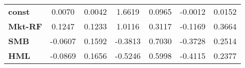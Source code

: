 \begin{center}
\begin{tabular}{lcccccc}
\midrule
\textbf{const}  &       0.0070       &       0.0042       &      1.6619     &      0.0965      &      -0.0012      &       0.0152       \\
\textbf{Mkt-RF} &       0.1247       &       0.1233       &      1.0116     &      0.3117      &      -0.1169      &       0.3664       \\
\textbf{SMB}    &      -0.0607       &       0.1592       &     -0.3813     &      0.7030      &      -0.3728      &       0.2514       \\
\textbf{HML}    &      -0.0869       &       0.1656       &     -0.5246     &      0.5998      &      -0.4115      &       0.2377       \\
\bottomrule
\end{tabular}
\end{center}
